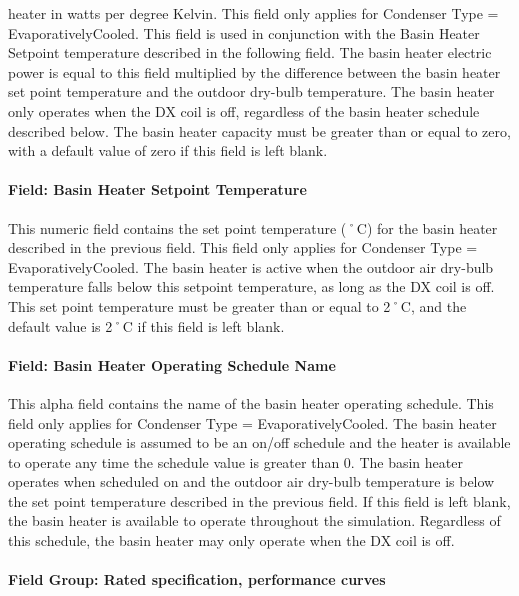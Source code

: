 heater in watts per degree Kelvin. This field only applies for Condenser Type = EvaporativelyCooled. This field is used in conjunction with the Basin Heater Setpoint temperature described in the following field. The basin heater electric power is equal to this field multiplied by the difference between the basin heater set point temperature and the outdoor dry-bulb temperature. The basin heater only operates when the DX coil is off, regardless of the basin heater schedule described below. The basin heater capacity must be greater than or equal to zero, with a default value of zero if this field is left blank.

\paragraph{Field: Basin Heater Setpoint Temperature}\label{field-basin-heater-setpoint-temperature-4}

This numeric field contains the set point temperature (˚C) for the basin heater described in the previous field. This field only applies for Condenser Type = EvaporativelyCooled. The basin heater is active when the outdoor air dry-bulb temperature falls below this setpoint temperature, as long as the DX coil is off. This set point temperature must be greater than or equal to 2˚C, and the default value is 2˚C if this field is left blank.

\paragraph{Field: Basin Heater Operating Schedule Name}\label{field-basin-heater-operating-schedule-name-4}

This alpha field contains the name of the basin heater operating schedule. This field only applies for Condenser Type = EvaporativelyCooled. The basin heater operating schedule is assumed to be an on/off schedule and the heater is available to operate any time the schedule value is greater than 0. The basin heater operates when scheduled on and the outdoor air dry-bulb temperature is below the set point temperature described in the previous field. If this field is left blank, the basin heater is available to operate throughout the simulation. Regardless of this schedule, the basin heater may only operate when the DX coil is off.

\paragraph{Field Group: Rated specification, performance curves}\label{field-group-rated-specification-performance-curves}

